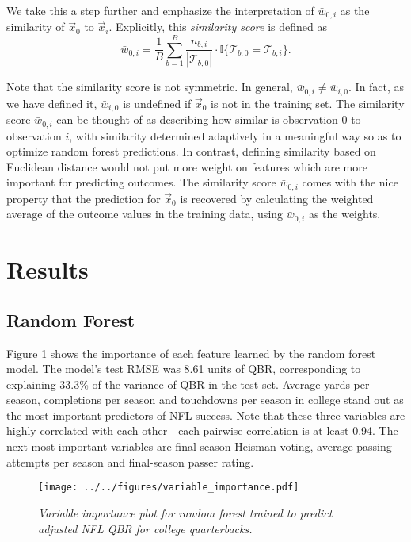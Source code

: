 \documentclass{article}
\begin{document}
We take this a step further and emphasize the interpretation of $\bar w_{0,i}$ as the similarity of $\vec x_0$ to $\vec x_i$. Explicitly, this {\it similarity score} is defined as
\begin{equation}
  \label{eqn:similarity}
  \bar w_{0,i} = \frac{1}{B}\sum_{b = 1}^B
    \frac{n_{b,i}}{|\mathcal{T}_{b,0}|} \cdot \mathbb{I}\{\mathcal{T}_{b,0} = \mathcal{T}_{b,i}\}.
\end{equation}

Note that the similarity score is not symmetric. In general, $\bar w_{0,i} \ne \bar w_{i,0}$. In fact, as we have defined it, $\bar w_{i,0}$ is undefined if $\vec x_0$ is not in the training set. The similarity score $\bar w_{0,i}$ can be thought of as describing how similar is observation 0 to observation $i$, with similarity determined adaptively in a meaningful way so as to optimize random forest predictions. In contrast, defining similarity based on Euclidean distance would not put more weight on features which are more important for predicting outcomes. The similarity score $\bar w_{0,i}$ comes with the nice property that the prediction for $\vec x_0$ is recovered by calculating the weighted average of the outcome values in the training data, using $\bar w_{0,i}$ as the weights.

\section{Results}
\label{sec:results}

\subsection{Random Forest}

Figure \ref{fig:importance} shows the importance of each feature learned by the random forest model. The model's test RMSE was 8.61 units of QBR, corresponding to explaining 33.3\% of the variance of QBR in the test set. Average yards per season, completions per season and touchdowns per season in college stand out as the most important predictors of NFL success. Note that these three variables are highly correlated with each other---each pairwise correlation is at least 0.94. The next most important variables are final-season Heisman voting, average passing attempts per season and final-season passer rating.

\begin{figure}[H]
    \centering
    \texttt{[image: ../../figures/variable\_importance.pdf]}
    \caption{\textit{Variable importance plot for random forest trained to predict adjusted NFL QBR for college quarterbacks.}}
    \label{fig:importance}
\end{figure}
\end{document}
